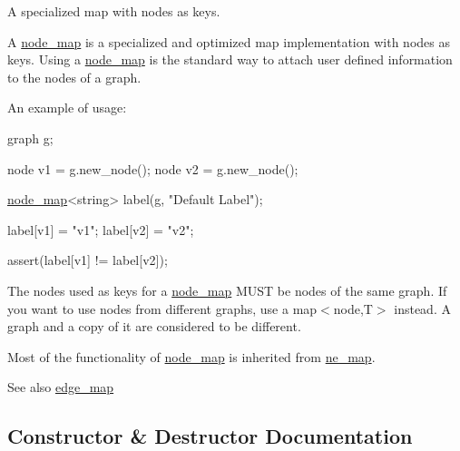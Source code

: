A specialized map with nodes as keys. 

A {\ttfamily \mbox{\hyperlink{classnode__map}{node\+\_\+map}}} is a specialized and optimized map implementation with nodes as keys. Using a {\ttfamily \mbox{\hyperlink{classnode__map}{node\+\_\+map}}} is the standard way to attach user defined information to the nodes of a {\ttfamily graph}.

An example of usage\+: 
\begin{DoxyPre}
  graph g;\end{DoxyPre}



\begin{DoxyPre}  node v1 = g.new\_node();
  node v2 = g.new\_node();\end{DoxyPre}



\begin{DoxyPre}  \mbox{\hyperlink{classnode__map}{node\_map}}<string> label(g, "Default Label");\end{DoxyPre}



\begin{DoxyPre}  label[v1] = "v1";
  label[v2] = "v2";\end{DoxyPre}



\begin{DoxyPre}  assert(label[v1] != label[v2]);
\end{DoxyPre}


The nodes used as keys for a {\ttfamily \mbox{\hyperlink{classnode__map}{node\+\_\+map}}} M\+U\+ST be nodes of the same graph. If you want to use nodes from different graphs, use a {\ttfamily map$<$node,T$>$} instead. A graph and a copy of it are considered to be different.

Most of the functionality of {\ttfamily \mbox{\hyperlink{classnode__map}{node\+\_\+map}}} is inherited from \mbox{\hyperlink{classne__map}{ne\+\_\+map}}.

\begin{DoxySeeAlso}{See also}
\mbox{\hyperlink{classedge__map}{edge\+\_\+map}} 
\end{DoxySeeAlso}


\subsection{Constructor \& Destructor Documentation}
\mbox{\label{classnode__map_a7a4c767f07f348d31a1004776485d17b}} 
